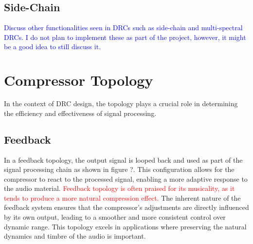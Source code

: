 \documentclass[10pt]{article}
\begin{document}
\begin{multicols}{2}
            \subsection{Side-Chain}
                \textcolor{blue}{Discuss other functionalities seen in DRCs such as side-chain and multi-spectral DRCs. I do not plan to implement these as part of the project, however, it might be a good idea to still discuss it.}
            
        \section{Compressor Topology}
            In the context of DRC design, the topology plays a crucial role in determining the efficiency and effectiveness of signal processing.

            \subsection{Feedback}  

                In a feedback topology, the output signal is looped back and used as part of the signal processing chain as shown in figure ?. This configuration allows for the compressor to react to the processed signal, enabling a more adaptive response to the audio material. \textcolor{red}{Feedback topology is often praised for its musicality, as it tends to produce a more natural compression effect.} The inherent nature of the feedback system ensures that the compressor's adjustments are directly influenced by its own output, leading to a smoother and more consistent control over dynamic range. This topology excels in applications where preserving the natural dynamics and timbre of the audio is important.
                
                \noindent
                \begin{minipage}{\linewidth}

                    \centering

\end{minipage}
\end{multicols}
\end{document}
